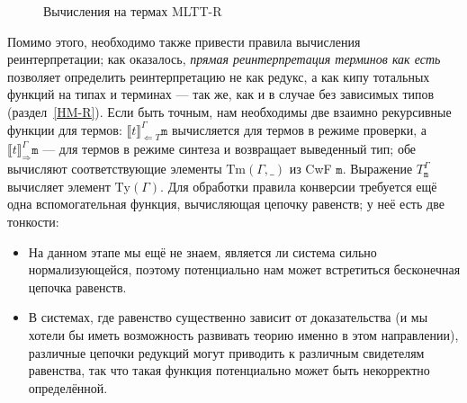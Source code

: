 \begin{figure}
    \caption{Вычисления на термах MLTT-R}
    \label{mltt-r-comp}
\end{figure}

Помимо этого, необходимо также привести правила
вычисления реинтерпретации; как оказалось,
\textit{прямая реинтерпретация терминов как есть}
позволяет определить реинтерпретацию не как редукс, а
как кипу тотальных функций на типах и терминах --- так
же, как и в случае без зависимых типов
(раздел~\ref{HM-R}). Если быть точным, нам необходимы
две взаимно рекурсивные функции для термов:
$\llbracket t\rrbracket^\Gamma_{\Leftarrow T}
\mathtt{m}$ вычисляется для термов в режиме проверки, а
$\llbracket t\rrbracket^\Gamma_{\Rightarrow}\mathtt{m}$
--- для термов в режиме синтеза и возвращает выведенный
тип; обе вычисляют соответствующие элементы
$\mathrm{Tm}(\Gamma,\_)$ из CwF $\mathtt{m}$. Выражение
$T^\Gamma_\mathtt{m}$ вычисляет элемент
$\mathrm{Ty}(\Gamma)$. Для обработки правила конверсии
требуется ещё одна вспомогательная функция, вычисляющая
цепочку равенств; у неё есть две тонкости:

\begin{itemize}
    \item На данном этапе мы ещё не знаем, является ли
        система сильно нормализующейся, поэтому
        потенциально нам может встретиться бесконечная
        цепочка равенств.
    \item В системах, где равенство существенно зависит
        от доказательства (и мы хотели бы иметь
        возможность развивать теорию именно в этом
        направлении), различные цепочки редукций могут
        приводить к различным свидетелям равенства, так
        что такая функция потенциально может быть
        некорректно определённой.
\end{itemize}

